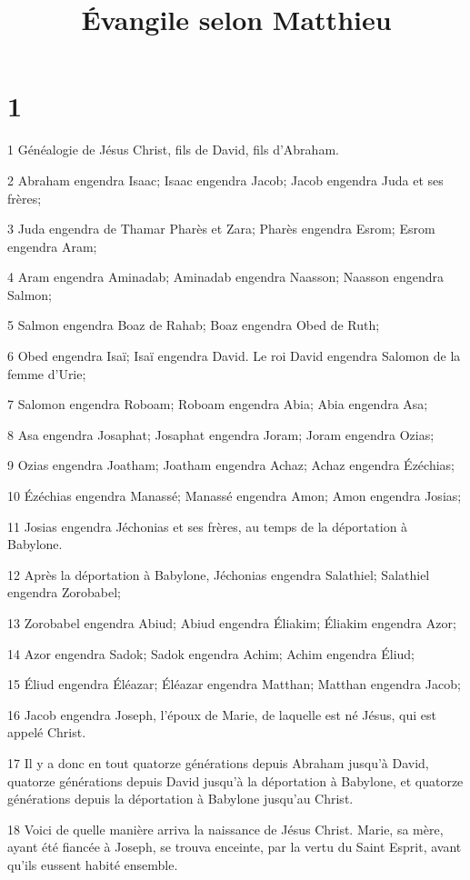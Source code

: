 

\title{Évangile selon Matthieu}


\chapter{1}

\par 1 Généalogie de Jésus Christ, fils de David, fils d'Abraham.
\par 2 Abraham engendra Isaac; Isaac engendra Jacob; Jacob engendra Juda et ses frères;
\par 3 Juda engendra de Thamar Pharès et Zara; Pharès engendra Esrom; Esrom engendra Aram;
\par 4 Aram engendra Aminadab; Aminadab engendra Naasson; Naasson engendra Salmon;
\par 5 Salmon engendra Boaz de Rahab; Boaz engendra Obed de Ruth;
\par 6 Obed engendra Isaï; Isaï engendra David. Le roi David engendra Salomon de la femme d'Urie;
\par 7 Salomon engendra Roboam; Roboam engendra Abia; Abia engendra Asa;
\par 8 Asa engendra Josaphat; Josaphat engendra Joram; Joram engendra Ozias;
\par 9 Ozias engendra Joatham; Joatham engendra Achaz; Achaz engendra Ézéchias;
\par 10 Ézéchias engendra Manassé; Manassé engendra Amon; Amon engendra Josias;
\par 11 Josias engendra Jéchonias et ses frères, au temps de la déportation à Babylone.
\par 12 Après la déportation à Babylone, Jéchonias engendra Salathiel; Salathiel engendra Zorobabel;
\par 13 Zorobabel engendra Abiud; Abiud engendra Éliakim; Éliakim engendra Azor;
\par 14 Azor engendra Sadok; Sadok engendra Achim; Achim engendra Éliud;
\par 15 Éliud engendra Éléazar; Éléazar engendra Matthan; Matthan engendra Jacob;
\par 16 Jacob engendra Joseph, l'époux de Marie, de laquelle est né Jésus, qui est appelé Christ.
\par 17 Il y a donc en tout quatorze générations depuis Abraham jusqu'à David, quatorze générations depuis David jusqu'à la déportation à Babylone, et quatorze générations depuis la déportation à Babylone jusqu'au Christ.
\par 18 Voici de quelle manière arriva la naissance de Jésus Christ. Marie, sa mère, ayant été fiancée à Joseph, se trouva enceinte, par la vertu du Saint Esprit, avant qu'ils eussent habité ensemble.

